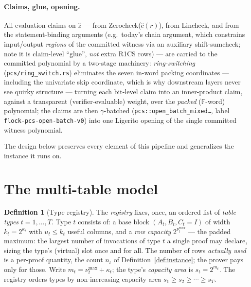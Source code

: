 \documentclass[11pt]{article}
\newcommand{\F}{\mathbb{F}}                       %
\newcommand{\code}[1]{\texttt{#1}}
\newcommand{\ZC}{\textsf{Zerocheck}\xspace}
\newcommand{\LC}{\textsf{Lincheck}\xspace}
\theoremstyle{definition}
\newtheorem{definition}{Definition}
\begin{document}
\paragraph{Claims, glue, opening.} All evaluation claims on $\hat z$ --- from
\ZC ($\hat c(r)$), from \LC, and from the statement-binding arguments (e.g.\
today's chain argument, which constrains input/output \emph{regions} of the
committed witness via an auxiliary shift-sumcheck; note it is claim-level
``glue'', \emph{not} extra R1CS rows) --- are carried to the committed
polynomial by a two-stage machinery: \emph{ring-switching}
(\code{pcs/ring\_switch.rs}) eliminates the seven in-word packing
coordinates --- including the univariate skip coordinate, which is why
downstream layers never see quirky structure --- turning each bit-level
claim into an inner-product claim, against a transparent
(verifier-evaluable) weight, over the \emph{packed} ($\F$-word)
polynomial; the claims are then $\gamma$-batched
(\code{pcs::open\_batch\_mixed\ldots}, label
\code{flock-pcs-open-batch-v0}) into one Ligerito opening of the single
committed witness polynomial.

The design below preserves every element of this pipeline and generalizes the
instance it runs on.

\section{The multi-table model}\label{sec:model}

\begin{definition}[Type registry]\label{def:registry}
The \emph{registry} fixes, once, an ordered list of \emph{table types}
$t = 1, \dots, T$. Type $t$ consists of: a base block
$(A_t, B_t, C_t{=}I)$ of width $k_t = 2^{\kappa_t}$ with $u_t \le k_t$
useful columns, and a \emph{row capacity} $2^{\nu_t^{\max}}$ --- the padded
maximum: the largest number of invocations of type $t$ a single proof may
declare, sizing the type's (virtual) slot once and for all. The number of
rows \emph{actually used} is a per-proof quantity, the count $n_t$ of
Definition~\ref{def:instance}; the prover pays only for those. Write
$m_t = \nu_t^{\max} + \kappa_t$; the type's \emph{capacity area} is
$s_t = 2^{m_t}$. The registry orders types by non-increasing capacity area
$s_1 \ge s_2 \ge \cdots \ge s_T$.
\end{definition}
\end{document}
